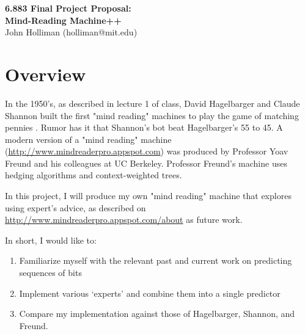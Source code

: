 \documentclass{article}
\begin{document}
\begin{center}
{\Large\bf 6.883 Final Project Proposal:} \\[1ex]
{\Large\bf Mind-Reading Machine++} \\[1ex]
{\large John Holliman (holliman@mit.edu)}
\end{center}

\vspace{-12pt}
\noindent\makebox[\linewidth]{\rule{\textwidth}{1pt}}
\vspace{3pt}

\section*{Overview}

In the 1950's, as described in lecture 1 of class, David Hagelbarger and Claude
Shannon built the first "mind reading" machines to play the game of matching
pennies \cite{Hag56, Sha53}.  Rumor has it that Shannon's bot beat
Hagelbarger's 55 to 45. A modern version of a "mind reading" machine
(\url{http://www.mindreaderpro.appspot.com}) was produced by Professor Yoav
Freund and his colleagues at UC Berkeley. Professor Freund's machine uses
hedging algorithms and context-weighted trees.

In this project, I will produce my own "mind reading" machine that explores
using expert's advice, as described on
\url{http://www.mindreaderpro.appspot.com/about} as future work.

In short, I would like to:
\begin{enumerate}
	\item Familiarize myself with the relevant past and current work \cite{Hag56,
		Sha53, Willems95, CB97} on predicting sequences of bits
	\item Implement various `experts' and combine them into a single predictor
	\item Compare my implementation against those of Hagelbarger, Shannon, and Freund.
\end{enumerate}

\medskip



\end{document}
